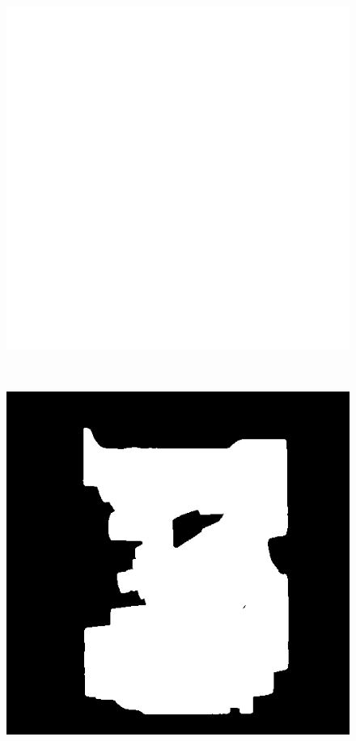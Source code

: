 \begin{figure}
	\centering
	\begin{minipage}{.33\textwidth}
		\includegraphics[width=1\linewidth]{images/engine_naive_saliencemap}
	\end{minipage}~
	\begin{minipage}{.33\textwidth}
		\includegraphics[width=1\linewidth]{images/engine_naive_saliencemap_1_overlap}

\end{minipage}
\end{figure}
